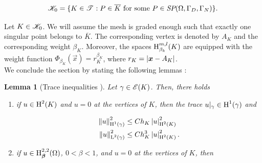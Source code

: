 \documentclass[a4paper,11pt]{article}
\newtheorem{lemma}[theorem]{Lemma}
\begin{document}
{\begin{equation}
    \mathscr K_{0} = \{ K \in \mathscr T^{} : P \in \overline{K} \text{ for some } P \in \textit{SP}(\Omega,\Gamma_{D},\Gamma_{N}) \}.
\end{equation}

Let $K \in \mathscr K_{0}$. We will assume the mesh is graded enough such that exactly one singular point belongs to $\overline{K}$. The corresponding vertex is denoted by $A_{K}$ and the corresponding weight $\beta_{K}$. Moreover, the spaces $\operatorname H^{m,l}_{\beta_{k}}(K)$ are equipped with the weight function $\Phi_{\beta_{K}}(\vec{x}) = r_{K}^{\beta_{K}}$, where $r_{K} = \left|\boldsymbol x - A_{K}\right|$.
\\
We conclude the section by stating the following lemmas \cite{Wihler:2003}:

\begin{lemma}[Trace inequalities {\cite[Lemma A.2.4]{Wihler:2003}}]
\label{lemma:trace_inequality}
Let $\gamma \in \mathscr E(K)$. Then, there holds

\begin{enumerate}
    \item if $u \in \operatorname H^{2}(K)$ and $u = 0$ at the vertices of $K$, then the trace $u|_{\gamma} \in \operatorname H^{1}(\gamma)$ and
    
    \begin{equation}
    \begin{split}
    \left\|u\right\|^{2}_{\operatorname H^{1}(\gamma)} &\leq Ch_{K}\left|u\right|^{2}_{\operatorname H^{2}(K)}\\
    \left\|u\right\|^{2}_{\operatorname L^{2}(\gamma)} &\leq  C h_{K}^{3}\left|u\right|^{2}_{\operatorname H^{2}(K)}.
    \end{split}
    \end{equation}

    \item  if $u \in \operatorname H^{2,2}_{\boldsymbol \beta}(\Omega)$, $0 < \beta < 1$, and $u = 0$ at the vertices of $K$, then 


\end{enumerate}
\end{lemma}}
\end{document}
